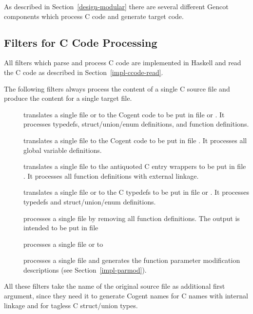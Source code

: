As described in Section~\ref{design-modular} there are several different Gencot components which process C code and generate 
target code.

\subsection{Filters for C Code Processing}
\label{impl-ccomps-filters}

All filters which parse and process C code are implemented in Haskell and read the
C code as described in Section~\ref{impl-ccode-read}.

The following filters always process the content of a single C source file and produce the content for a single 
target file.
\begin{description}
\item[] translates a single file  or  to the Cogent code to be put in file
 or . It processes typedefs, struct/union/enum definitions, and function
definitions. 
\item[] translates a single file  to the Cogent code to be put in file .
It processes all global variable definitions.
\item[] translates a single file  to the antiquoted C entry wrappers to be put in
file . It processes all function definitions with external linkage.
\item[] translates a single file  or  to the C typedefs to be put in
file  or . It processes typedefs and struct/union/enum definitions.
\item[] processes a single file  by removing all function definitions. The output
is intended to be put in file 
\item[] processes a single file  or  to 
\item[] processes a single file  and generates the 
function parameter modification descriptions (see Section~\ref{impl-parmod}).
\end{description}

All these filters take the name of the original source file as additional first
argument, since they need it to generate Cogent names for C names with internal linkage and for tagless C struct/union
types.


